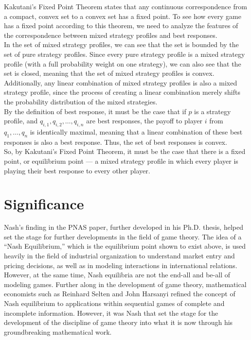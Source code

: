 \documentclass[12pt]{extarticle}
\begin{document}
  Kakutani's Fixed Point Theorem states that any continuous correspondence from a compact, convex set to a convex set has a fixed point. To see how every game has a fixed point according to this theorem, we need to analyze the features of the correspondence between mixed strategy profiles and best responses.\\

  In the set of mixed strategy profiles, we can see that the set is bounded by the set of pure strategy profiles. Since every pure strategy profile is a mixed strategy profile (with a full probability weight on one strategy), we can also see that the set is closed, meaning that the set of mixed strategy profiles is convex. Additionally, any linear combination of mixed strategy profiles is also a mixed strategy profile, since the process of creating a linear combination merely shifts the probability distribution of the mixed strategies.\\

  By the definition of best response, it must be the case that if $p$ is a strategy profile, and $q_{i,1},q_{i,2},\dots,q_{i,n}$ are best responses, the payoff to player $i$ from $q_1,\dots,q_n$ is identically maximal, meaning that a linear combination of these best responses is also a best response. Thus, the set of best responses is convex.\\

  So, by Kakutani's Fixed Point Theorem, it must be the case that there is a fixed point, or equilibrium point --- a mixed strategy profile in which every player is playing their best response to every other player.
  \section*{Significance}%
  Nash's finding in the PNAS paper, further developed in his Ph.D. thesis, helped set the stage for further developments in the field of game theory. The idea of a ``Nash Equilibrium,'' which is the equilibrium point shown to exist above, is used heavily in the field of industrial organization to understand market entry and pricing decisions, as well as in modeling interactions in international relations.\\

  However, at the same time, Nash equilibria are not the end-all and be-all of modeling games. Further along in the development of game theory, mathematical economists such as Reinhard Selten and John Harsanyi refined the concept of Nash equilibrium to applications within sequential games of complete and incomplete information.\supercite{nash_selten_harsanyi_nobel} However, it was Nash that set the stage for the development of the discipline of game theory into what it is now through his groundbreaking mathematical work.
  \printbibliography
\end{document}
